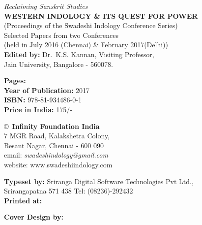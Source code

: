 \thispagestyle{empty}
\noindent
{\fontsize{9}{11}\selectfont\sl Reclaiming Sanskrit Studies}\\
{\bf WESTERN INDOLOGY \& ITS QUEST FOR POWER}\\ 
(Proceedings of the Swadeshi Indology Conference Series)\\
Selected Papers from two Conferences\\ 
(held in July 2016 (Chennai) \& February 2017(Delhi))\\
{\bf Edited by:} Dr.\ K.S. Kannan, Visiting Professor,\\ 
Jain University, Bangalore - 560078.
\vfill

\noindent
{\bf Pages:} \pageref{bookend}\\
{\bf Year of Publication:} 2017\\
{\bf ISBN:} 978-81-934486-0-1\\
{\bf Price in India:} 175/-
\vfill

\noindent
\copyright\ {\bf Infinity Foundation India}\\ 
7 MGR Road, Kalakshetra Colony,\\ 
Besant Nagar, Chennai - 600 090\\
email: {\sl swadeshindology@gmail.com}\\ 
website: www.swadeshiindology.com 
\vfill

\noindent
{\bf Typeset by:} Sriranga Digital Software Technologies Pvt Ltd.,\\ 
Srirangapatna 571 438 Tel: (08236)-292432\\

\noindent
{\bf Printed at:}

\noindent
{\bf Cover Design by:}
